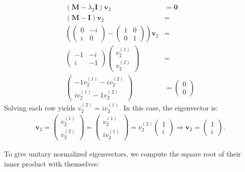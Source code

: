 \documentclass[letterpaper,11pt,twoside]{article}
\begin{document}
\begin{itemize}
  \begin{align*}
    (\bm{M}-\lambda_2\bm{I})\bm{v}_2&=\bm{0}\\
    (\bm{M}-\bm{I})\bm{v}_2&=\\
    \left(\begin{pmatrix}
      0&-i\\i&0
    \end{pmatrix}-\begin{pmatrix}
      1&0\\0&1
    \end{pmatrix}\right)\bm{v}_2&=\\
    \begin{pmatrix}
      -1&-i\\i&-1
    \end{pmatrix}\begin{pmatrix}
    v_2^{(1)}\\v_2^{(2)}
    \end{pmatrix}&=\\
    \begin{pmatrix}
      -1v_2^{(1)}-iv_2^{(2)}\\
      iv_2^{(1)}-1v_2^{(2)}
    \end{pmatrix}&=\begin{pmatrix}
      0\\0
    \end{pmatrix}
  \end{align*}
  Solving each row yields $v_2^{(2)}=iv_2^{(1)}$. In this case, the eigenvector is:
  \begin{align}
    \bm{v}_2=\begin{pmatrix}
    v_2^{(1)}\\v_2^{(2)}
    \end{pmatrix}=\begin{pmatrix}
      v_2^{(1)}\\iv_2^{(1)}
    \end{pmatrix}=v_2^{(2)}\begin{pmatrix}
      1\\i
    \end{pmatrix}\Longrightarrow\bm{v}_2=\begin{pmatrix}
      1\\i
    \end{pmatrix}.
  \end{align}
\end{itemize}
To give unitary normalized eigenvectors, we compute the square root of their inner product with themselves:
\end{document}
